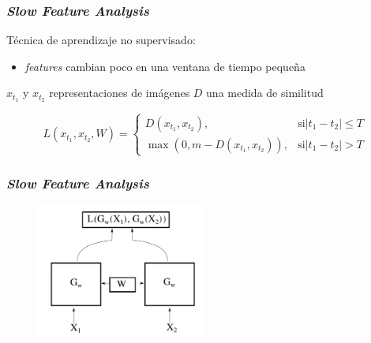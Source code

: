 \documentclass{beamer}
\begin{document}
\begin{frame}[plain]
\frametitle{\textit{Slow Feature Analysis}}

\vfill
Técnica de aprendizaje no supervisado:
\vfill
\begin{itemize}
    \item \textit{features} cambian poco en una ventana de tiempo pequeña \pause
\end{itemize}
\vfill

\(x_{t_1}\) y \(x_{t_2}\) representaciones de imágenes
\vfill
\(D\) una medida de similitud
\vfill

\begin{equation}
L(x_{t_1}, x_{t_2}, W) = \begin{cases}
                           D(x_{t_1}, x_{t_2}),& \text{si} |t_1 - t_2| \leq T \\ 
                           \max{(0, m - D(x_{t_1}, x_{t_2}))},& \text{si} |t_1 - t_2| > T
                         \end{cases}
\end{equation}
\vfill
\end{frame}





\begin{frame}[plain]
\frametitle{\textit{Slow Feature Analysis}}
\begin{figure}
    \centering
    \includegraphics[width=0.5\textwidth]{images/siamese-diagram.pdf}
\end{figure}
\end{frame}
\end{document}

